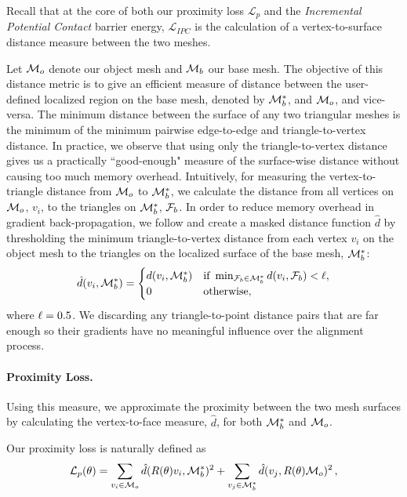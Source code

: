 Recall that at the core of both our proximity loss $\mathcal{L}_p$ and the \textit{Incremental Potential Contact} barrier energy, $\mathcal{L}_{IPC}$ is the calculation of a vertex-to-surface distance measure between the two meshes. 

Let $\mathcal{M}_o$ denote our object mesh and $\mathcal{M}_b$ our base mesh. The objective of this distance metric is to give an efficient measure of distance between the user-defined localized region on the base mesh, denoted by $\mathcal{M}_b^*$, and $\mathcal{M}_o$, and vice-versa. The minimum distance between the surface of any two triangular meshes is the minimum of the minimum pairwise edge-to-edge and triangle-to-vertex distance.
 In practice, we observe that using only the triangle-to-vertex distance gives us a practically ``good-enough" measure of the surface-wise distance without causing too much memory overhead. Intuitively, for measuring the vertex-to-triangle distance from $\mathcal{M}_o$ to $\mathcal{M}_b^*$, we calculate the distance from all vertices on $\mathcal{M}_o$, $v_i$, to the triangles on $\mathcal{M}_b^*$, $\mathcal{F}_b$.
In order to reduce memory overhead in gradient back-propagation, we follow \cite{li2020incremental} and create a masked distance function $\hat{d}$ by thresholding the minimum triangle-to-vertex distance from each vertex $v_i$ on the object mesh to the triangles on the localized surface of the base mesh, $\mathcal{M}_b^*$:
\[
\hat{d}(v_i, \mathcal{M}_b^*) = 
\begin{cases}
d(v_i, \mathcal{M}_b^*) & \text{if } \min_{\mathcal{F}_b \in \mathcal{M}_b^*} d(v_i, \mathcal{F}_b) < \ell,\\
0 & \text{otherwise},
\end{cases}
\]
where $\ell = 0.5$. We discarding any triangle-to-point distance pairs that are far enough so their gradients have no meaningful influence over the alignment process. 

\paragraph{Proximity Loss.}
Using this measure, we approximate the proximity between the two mesh surfaces by calculating the vertex-to-face measure, $\hat{d}$, for both $\mathcal{M}_b^*$ and $\mathcal{M}_o$.

Our proximity loss is naturally defined as 
\begin{equation}
\mathcal{L}_{p}(\theta) = \sum_{v_{i} \in \mathcal{M}_o} \hat{d} (R(\theta)v_i, \mathcal{M}_b^*)^2 +  \sum_{v_{j} \in \mathcal{M}_b^*} \hat{d}(v_j, R (\theta)\mathcal{M}_o)^2\, ,
\label{proximity_loss}
\end{equation}

